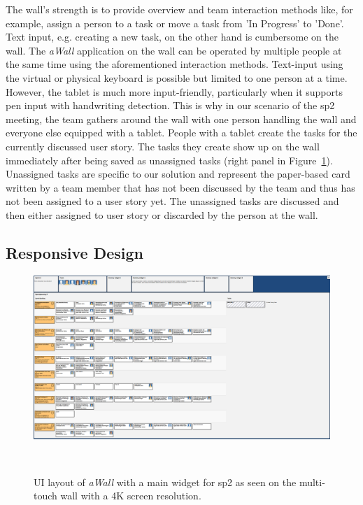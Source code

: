 \documentclass{sigchi}
\begin{document}
The wall's strength is to provide overview and team interaction methods like, for example, assign a person to a task or move a task from 'In Progress' to 'Done'. 
Text input, e.g. creating a new task, on the other hand is cumbersome on the wall. 
The \textit{aWall} application on the wall can be operated by multiple people at the same time using the aforementioned interaction methods.
Text-input using the virtual or physical keyboard is possible but limited to one person at a time.
However, the tablet is much more input-friendly, particularly when it supports pen input with handwriting detection.
This is why in our scenario of the \gls{sp2} meeting, the team gathers around the wall with one person handling the wall and everyone else equipped with a tablet.
People with a tablet create the tasks for the currently discussed user story.
The tasks they create show up on the wall immediately after being saved as unassigned tasks (right panel in Figure~\ref{fig:awall-layout}).
Unassigned tasks are specific to our solution and represent the paper-based card written by a team member that has not been discussed by the team and thus has not been assigned to a user story yet.
The unassigned tasks are discussed and then either assigned to user story or discarded by the person at the wall.


\subsection{Responsive Design}

\begin{figure}
	\centering
	\includegraphics[width=\columnwidth]{figures/awall-layout}
	\caption{UI layout of \textit{aWall} with a main widget for \gls{sp2} as seen on the multi-touch wall with a 4K screen resolution.}~\label{fig:awall-layout}
\end{figure}
\end{document}

